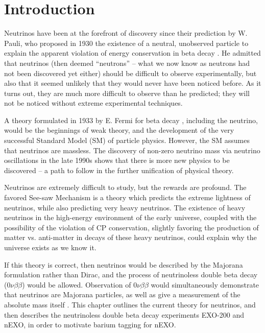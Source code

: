 \chapter{Introduction}

Neutrinos have been at the forefront of discovery since their prediction by W. Pauli, who proposed in 1930 the existence of a neutral, unobserved particle to explain the apparent violation of energy conservation in beta decay \cite{betaspectrum}. He admitted that neutrinos (then deemed ``neutrons'' -- what we now know as neutrons had not been discovered yet either) should be difficult to observe experimentally, but also that it seemed unlikely that they would never have been noticed before.  As it turns out, they are much more difficult to observe than he predicted; they will not be noticed without extreme experimental techniques.

A theory formulated in 1933 by E. Fermi for beta decay \cite{FermiBetaDecay}, including the neutrino, would be the beginnings of weak theory, and the development of the very successful Standard Model (SM) of particle physics.  However, the SM assumes that neutrinos are massless.  The discovery of non-zero neutrino mass via neutrino oscillations in the late 1990s \cite{SuperK} shows that there is more new physics to be discovered -- a path to follow in the further unification of physical theory.

Neutrinos are extremely difficult to study, but the rewards are profound.  The favored See-saw Mechanism is a theory which predicts the extreme lightness of neutrinos, while also predicting very heavy neutrinos.  The existence of heavy neutrinos in the high-energy environment of the early universe, coupled with the possibility of the violation of CP conservation, slightly favoring the production of matter vs. anti-matter in decays of these heavy neutrinos, could explain why the universe exists as we know it.  
\cite{SeeSaw}

If this theory is correct, then neutrinos would be described by the Majorana formulation rather than Dirac, and the process of neutrinoless double beta decay ($0\nu\beta\beta$) would be allowed.  Observation of $0\nu\beta\beta$ would simultaneously demonstrate that neutrinos are Majorana particles, as well as give a measurement of the absolute mass itself \cite{effectiveMass}.  This chapter outlines the current theory for neutrinos, and then describes the neutrinoless double beta decay experiments EXO-200 and nEXO, in order to motivate barium tagging for nEXO.

